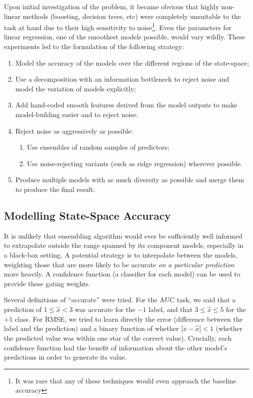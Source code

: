 \documentclass{article}
\begin{document}
Upon initial investigation of the problem, it became obvious that highly non-linear methods (boosting, decision trees, etc) were completely unsuitable to the task at hand due to their high sensitivity to noise\footnote{It was rare that any of these techniques would even approach the baseline accuracy}.  Even the parameters for linear regression, one of the smoothest models possible, would vary wildly.  These experiments led to the formulation of the following strategy:

\begin{enumerate}
\item Model the accuracy of the models over the different regions of the state-space;
\item Use a decomposition with an information bottleneck to reject noise and model the variation of models explicitly;
\item Add hand-coded smooth features derived from the model outputs to make model-building easier and to reject noise.
\item Reject noise as aggressively as possible:
  \begin{enumerate}
  \item Use ensembles of random samples of predictors;
  \item Use noise-rejecting variants (such as ridge regression) wherever possible.
    \end{enumerate}
\item Produce multiple models with as much diversity as possible and merge them to produce the final result.
\end{enumerate}


\subsection{Modelling State-Space Accuracy}

It is unlikely that ensembling algorithm would ever be sufficiently well informed to extrapolate outside the range spanned by its component models, especially in a black-box setting.  A potential strategy is to interpolate between the models, weighting those that are more likely to be accurate \emph{on a particular prediction} more heavily.  A confidence function (a classifier for each model) can be used to provide these gating weights.

Several definitions of ``accurate'' were tried.  For the AUC task, we said that a prediction of $1 \leq \hat{x} < 3$ was accurate for the $-1$ label, and that $3 \leq \hat{x} \leq 5$ for the $+1$ class.  For RMSE, we tried to learn directly the error (difference between the label and the prediction) and a binary function of whether $|x - \hat{x}| < 1$ (whether the predicted value was within one star of the correct value).  Crucially, each confidence function had the benefit of information about the other model's predictions in order to generate its value.
\end{document}

